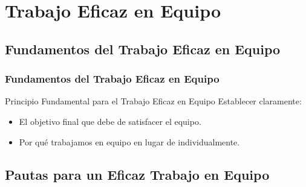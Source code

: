 \documentclass[handout,a4paper,t,xcolor=pst,dvips]{beamer}
\begin{document}
\section{Trabajo Eficaz en Equipo}

\subsection{Fundamentos del Trabajo Eficaz en Equipo}

\begin{frame}[c]
	\frametitle{Fundamentos del Trabajo Eficaz en Equipo}
	\begin{block}{Principio Fundamental para el Trabajo Eficaz en Equipo}
		Establecer claramente:
		\begin{itemize}
			\item<2-> El objetivo final que debe de satisfacer el equipo.
			\item<3-> Por qué trabajamos en equipo en lugar de individualmente.
		\end{itemize}
	\end{block}
\end{frame}

\subsection{Pautas para un Eficaz Trabajo en Equipo}

\end{document}
